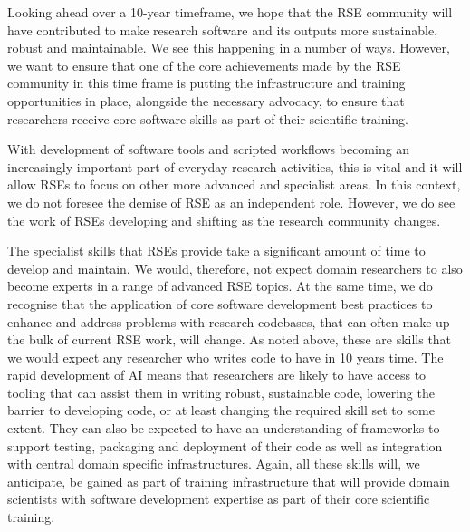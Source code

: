 \documentclass{eceasst}
\begin{document}
Looking ahead over a 10-year timeframe, we hope that the RSE community will have
contributed to make research software and its outputs
more sustainable, robust and maintainable. We see this happening in a number of ways. However,
we want to ensure that one of the core achievements made by the RSE community in this time
frame is putting the infrastructure and training opportunities in place, alongside the necessary
advocacy, to ensure that researchers receive core software skills as part of their scientific training.

With development of software tools and scripted workflows becoming an increasingly important part of everyday
research activities, this is vital and it will allow RSEs to focus on other more advanced and specialist
areas. In this context, we do not foresee the demise of RSE as an independent role. However, we
do see the work of RSEs developing and shifting as the research community changes.

The specialist skills that RSEs provide take a significant amount of time to develop and maintain.
We would, therefore, not expect domain researchers to also become experts in a range of
advanced RSE topics. 
At the same time, we do recognise that the application of core software development best practices
to enhance and address problems with research codebases, that can often make up the bulk of
current RSE work, will change. As noted above, these are skills that we
would expect any researcher who writes code to have in 10 years time. 
The rapid development of AI means that researchers are likely to have access to tooling that can assist
them in writing robust, sustainable code, lowering the barrier to developing code, or at least changing the
required skill set to some extent.
They can also be expected to have an understanding of frameworks to support testing, packaging and
deployment of their code as well as integration with central domain specific infrastructures.
Again, all these skills will, we anticipate, be gained as part of training infrastructure that will
provide domain scientists with software development expertise as part of their core scientific training.
\end{document}
